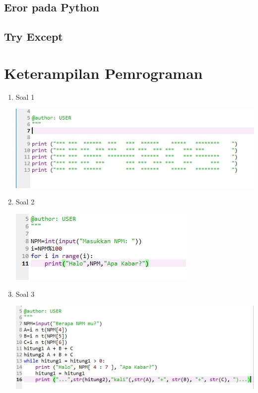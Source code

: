 \documentclass[a4paper,12pt]{report}
\begin{document}
\subsection{Eror pada Python}
\subsection{Try Except}

\section{Keterampilan Pemrograman}
\begin{enumerate}
    \item Soal 1
    \begin{center}
    \includegraphics[width=11cm\textwidth]{Figure/1.jpg}
    \end{center}
    \item Soal 2
    \begin{center}
    \includegraphics[width=11cm\textwidth]{Figure/2.jpg}
    \end{center}
    \item Soal 3
    \begin{center}
    \includegraphics[width=11cm\textwidth]{Figure/3.jpg}
    \end{center}

\end{enumerate}
\end{document}
